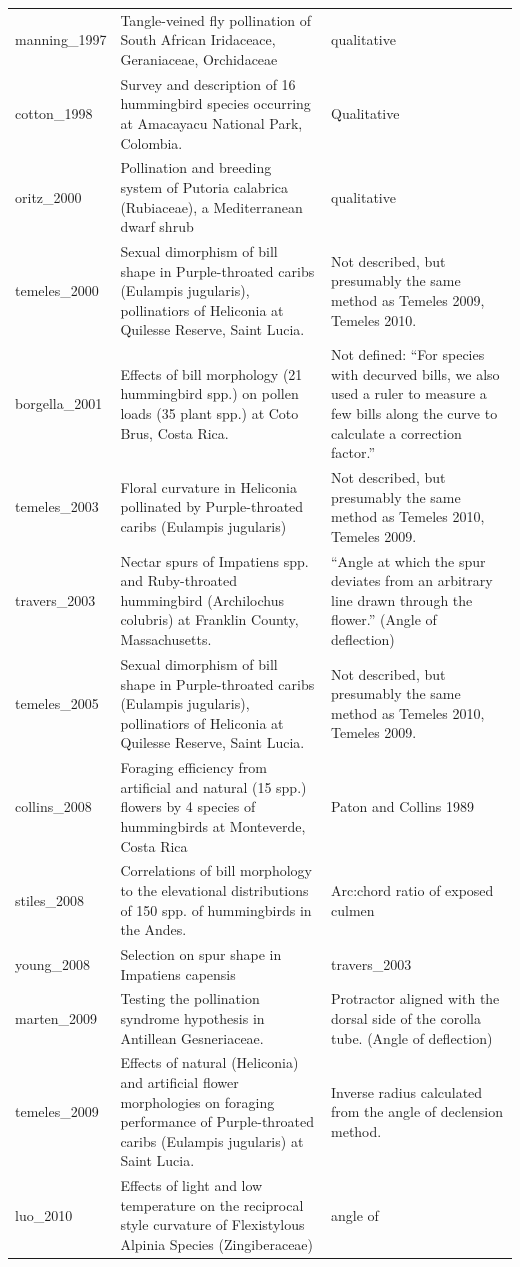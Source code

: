 \documentclass[]{article}
\begin{document}
\begin{longtable}[]{@{}lll@{}}
manning\_1997 & Tangle-veined fly pollination of South African
Iridaceace, Geraniaceae, Orchidaceae & qualitative\tabularnewline
cotton\_1998 & Survey and description of 16 hummingbird species
occurring at Amacayacu National Park, Colombia. &
Qualitative\tabularnewline
oritz\_2000 & Pollination and breeding system of Putoria calabrica
(Rubiaceae), a Mediterranean dwarf shrub & qualitative\tabularnewline
temeles\_2000 & Sexual dimorphism of bill shape in Purple-throated
caribs (Eulampis jugularis), pollinatiors of Heliconia at Quilesse
Reserve, Saint Lucia. & Not described, but presumably the same method as
Temeles 2009, Temeles 2010.\tabularnewline
borgella\_2001 & Effects of bill morphology (21 hummingbird spp.) on
pollen loads (35 plant spp.) at Coto Brus, Costa Rica. & Not defined:
``For species with decurved bills, we also used a ruler to measure a few
bills along the curve to calculate a correction factor.''\tabularnewline
temeles\_2003 & Floral curvature in Heliconia pollinated by
Purple-throated caribs (Eulampis jugularis) & Not described, but
presumably the same method as Temeles 2010, Temeles 2009.\tabularnewline
travers\_2003 & Nectar spurs of Impatiens spp. and Ruby-throated
hummingbird (Archilochus colubris) at Franklin County, Massachusetts. &
``Angle at which the spur deviates from an arbitrary line drawn through
the flower.'' (Angle of deflection)\tabularnewline
temeles\_2005 & Sexual dimorphism of bill shape in Purple-throated
caribs (Eulampis jugularis), pollinatiors of Heliconia at Quilesse
Reserve, Saint Lucia. & Not described, but presumably the same method as
Temeles 2010, Temeles 2009.\tabularnewline
collins\_2008 & Foraging efficiency from artificial and natural (15
spp.) flowers by 4 species of hummingbirds at Monteverde, Costa Rica &
Paton and Collins 1989\tabularnewline
stiles\_2008 & Correlations of bill morphology to the elevational
distributions of 150 spp. of hummingbirds in the Andes. & Arc:chord
ratio of exposed culmen\tabularnewline
young\_2008 & Selection on spur shape in Impatiens capensis &
travers\_2003\tabularnewline
marten\_2009 & Testing the pollination syndrome hypothesis in Antillean
Gesneriaceae. & Protractor aligned with the dorsal side of the corolla
tube. (Angle of deflection)\tabularnewline
temeles\_2009 & Effects of natural (Heliconia) and artificial flower
morphologies on foraging performance of Purple-throated caribs (Eulampis
jugularis) at Saint Lucia. & Inverse radius calculated from the angle of
declension method.\tabularnewline
luo\_2010 & Effects of light and low temperature on the reciprocal style
curvature of Flexistylous Alpinia Species (Zingiberaceae) & angle of

\end{longtable}
\end{document}
